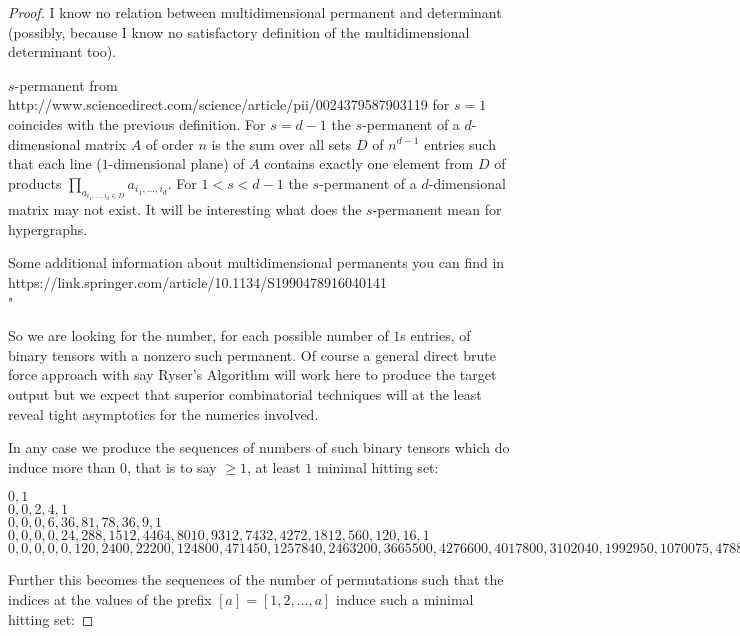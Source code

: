 \documentclass[12pt]{article}
\begin{document}
\begin{proof}
	I know no relation between multidimensional permanent and determinant (possibly, because I know no satisfactory definition of the multidimensional determinant too).
	
	$s$-permanent from http://www.sciencedirect.com/science/article/pii/0024379587903119 for $s = 1$ coincides with the previous definition. For $s = d - 1$ the $s$-permanent of a $d$-dimensional matrix $A$ of order $n$ is the sum over all sets $D$ of $n^{d-1}$ entries such that each line ($1$-dimensional plane) of $A$ contains exactly one element from $D$ of products $\prod_{a_{i_1,\dots,i_d \in D}} a_{i_1,\dots,i_d}$. For $1 < s < d-1$ the $s$-permanent of a $d$-dimensional matrix may not exist. It will be interesting what does the $s$-permanent mean for hypergraphs.
	
	Some additional information about multidimensional permanents you can find in https://link.springer.com/article/10.1134/S1990478916040141 \\
	"

	So we are looking for the number, for each possible number of $1$s entries, of binary tensors with a nonzero such permanent. Of course a general direct brute force approach with say Ryser's Algorithm will work here to produce the target output but we expect that superior combinatorial techniques will at the least reveal tight asymptotics for the numerics involved.

	In any case we produce the sequences of numbers of such binary tensors which do induce more than $0$, that is to say $\ge 1$, at least $1$ minimal hitting set:

	$0,1$ \\
	$0,0,2,4,1$ \\
	$0,0,0,6,36,81,78,36,9,1$ \\
	$0,0,0,0,24,288,1512,4464,8010,9312,7432,4272,1812,560,120,16,1$ \\
	$0,0,0,0,0,120,2400,22200,124800,471450,1257840,2463200,3665500,4276600,4017800,3102040,1992950,1070075,478800,176900,53120,12650,2300,300,25,1$

	Further this becomes the sequences of the number of permutations such that the indices at the values of the prefix $[a] = [1,2,\dots,a]$ induce such a minimal hitting set:


\end{proof}
\end{document}
